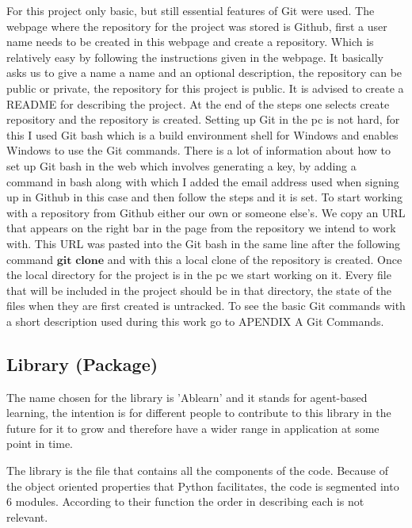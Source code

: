\documentclass{book}
\begin{document}
For this project only basic, but still essential features of Git were used. The webpage where the repository for the project was stored is Github, first a user name needs to be created in this webpage and create a repository. Which is relatively easy by following the instructions given in the webpage. It basically asks us to give a name a name and an optional description, the repository can be public or private, the repository for this project is public. It is advised to create a README for describing the project. At the end of the steps one selects create repository and the repository is created. Setting up Git in the pc is not hard, for this I used Git bash which is a build environment shell for Windows and enables Windows to use the Git commands.
There is a lot of information about how to set up Git bash in the web which involves generating a key, by adding a command in bash along with which I added the email address used when signing up in Github in this case and then follow the steps and it is set. 
To start working with a repository from Github either our own or someone else's. We copy an URL that appears on the right bar in the page from the repository we intend to work with. 
This URL was pasted into the Git bash  in the same line after the following command $\textbf{git clone}$ and with this a local clone of the repository is created.
Once the local directory for the project is in the pc we start working on it. Every file that will be included in the project should be in that directory, the state of the files when they are first created is untracked. To see the basic Git commands with a short description used during this work go to APENDIX A Git Commands.

\subsection{Library (Package)}\label{library_section}
The name chosen for the library is 'Ablearn' and it stands for agent-based learning, the intention is for different people to contribute to this library in the future for it to grow and therefore have a wider range in application at some point in time.

The library is the file that contains all the components of the code. Because of the object oriented properties that Python facilitates, the code is segmented into 6 modules. According to their function the order in describing each is not relevant.
\end{document}
